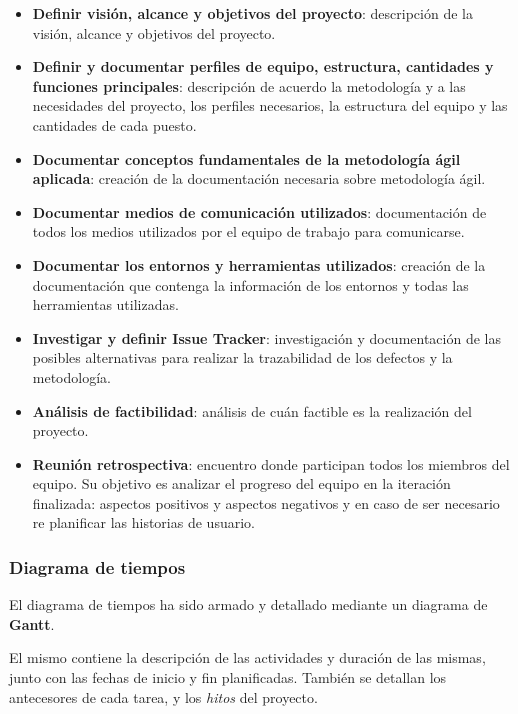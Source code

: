 \begin{itemize}
    \item{\textbf{Definir visión, alcance y objetivos del proyecto}:}
    descripción de la visión, alcance y objetivos del proyecto.
    \item{\textbf{Definir y documentar perfiles de equipo, estructura, cantidades y funciones principales}:}
    descripción de acuerdo la metodología y a las necesidades del proyecto, los perfiles necesarios, la estructura del equipo y las cantidades de cada puesto.
    \item{\textbf{Documentar conceptos fundamentales de la metodología ágil aplicada}:}
    creación de la documentación necesaria sobre metodología ágil.
    \item{\textbf{Documentar medios de comunicación utilizados}:}
    documentación de todos los medios utilizados por el equipo de trabajo para comunicarse.
    \item{\textbf{Documentar los entornos y herramientas utilizados}:}
    creación de la documentación que contenga la información de los entornos y todas las herramientas utilizadas.
    \item{\textbf{Investigar y definir Issue Tracker}:}
    investigación y documentación de las posibles alternativas para realizar la trazabilidad de los defectos y la metodología.
    \item{\textbf{Análisis de factibilidad}:}
    análisis de cuán factible es la realización del proyecto.
    \item{\textbf{Reunión retrospectiva}:}
    encuentro donde participan todos los miembros del equipo.
    Su objetivo es analizar el progreso del equipo en la iteración finalizada: aspectos positivos y aspectos negativos y en caso de ser necesario re planificar las historias de usuario.
    
    
    
\end{itemize}



\subsubsection{Diagrama de tiempos}

El diagrama de tiempos ha sido armado y detallado mediante un diagrama de \textbf{Gantt}.

El mismo contiene la descripción de las actividades y duración de las mismas, junto con las fechas de inicio y fin planificadas. También se detallan los antecesores de cada tarea, y los \textit{hitos} del proyecto.

